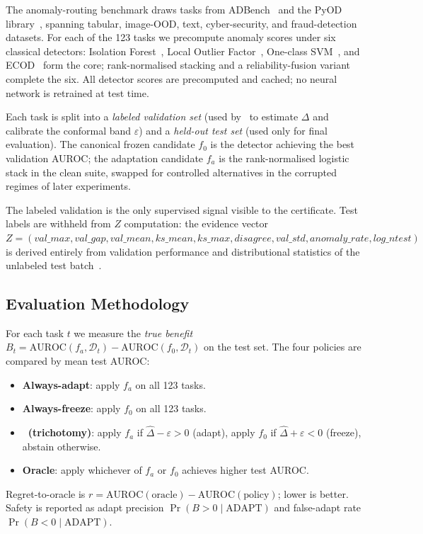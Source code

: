 The anomaly-routing benchmark draws tasks from ADBench~\cite{han2022adbench} and the
PyOD library~\cite{zhao2019pyod}, spanning tabular, image-OOD, text, cyber-security, and
fraud-detection datasets.  For each of the 123 tasks we precompute anomaly scores under
six classical detectors: Isolation Forest~\cite{liu2008isolation}, Local Outlier
Factor~\cite{breunig2000lof}, One-class SVM~\cite{scholkopf2001estimating}, and
ECOD~\cite{li2022ecod} form the core; rank-normalised stacking and a reliability-fusion
variant complete the six.  All detector scores are precomputed and cached; no neural
network is retrained at test time.

Each task is split into a \emph{labeled validation set} (used by \KGA\ to estimate $\Delta$
and calibrate the conformal band $\varepsilon$) and a \emph{held-out test set} (used only for
final evaluation).  The canonical frozen candidate $f_0$ is the detector achieving the
best validation AUROC; the adaptation candidate $f_a$ is the rank-normalised logistic
stack in the clean suite, swapped for controlled alternatives in the corrupted regimes of
later experiments.

The labeled validation is the only supervised signal visible to the certificate.  Test
labels are withheld from $Z$ computation: the evidence vector
$Z = (\textit{val\_max}, \textit{val\_gap}, \textit{val\_mean}, \textit{ks\_mean},
\textit{ks\_max}, \textit{disagree}, \textit{val\_std}, \textit{anomaly\_rate},
\textit{log\_ntest})$ is derived entirely from validation performance and distributional
statistics of the unlabeled test batch~\cite{kbound2026repo}.

\subsection{Evaluation Methodology}

For each task $t$ we measure the \emph{true benefit} $B_t = \mathrm{AUROC}(f_a, \mathcal{D}_t)
- \mathrm{AUROC}(f_0, \mathcal{D}_t)$ on the test set.  The four policies are compared by
mean test AUROC:
\begin{itemize}
  \item \textbf{Always-adapt}: apply $f_a$ on all 123 tasks.
  \item \textbf{Always-freeze}: apply $f_0$ on all 123 tasks.
  \item \textbf{\KGA\ (trichotomy)}: apply $f_a$ if $\widehat\Delta - \varepsilon > 0$
    (adapt), apply $f_0$ if $\widehat\Delta + \varepsilon < 0$ (freeze), abstain otherwise.
  \item \textbf{Oracle}: apply whichever of $f_a$ or $f_0$ achieves higher test AUROC.
\end{itemize}
Regret-to-oracle is $r = \mathrm{AUROC}(\text{oracle}) - \mathrm{AUROC}(\text{policy})$;
lower is better.  Safety is reported as adapt precision
$\Pr(B > 0 \mid \text{ADAPT})$ and false-adapt rate $\Pr(B < 0 \mid \text{ADAPT})$.

